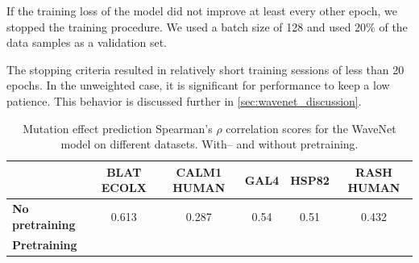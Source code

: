  If the training loss of the model did not improve at least every other epoch, we stopped the training procedure. We used a batch size of 128 and used $20\%$ of the data samples as a validation set.

The stopping criteria resulted in relatively short training sessions of less than 20 epochs. In the unweighted case, it is significant for performance to keep a low patience. This behavior is discussed further in \ref{sec:wavenet_discussion}. %




\begin{table}[ht]
    \centering
    \begin{tabularx}{\textwidth}{l ccccc}
    \hline
    & \textbf{BLAT ECOLX} & \textbf{CALM1 HUMAN} & \textbf{GAL4} & \textbf{HSP82} & \textbf{RASH HUMAN} \\ \hline
    \textbf{No pretraining} & 0.613 & 0.287 & 0.54 & 0.51 & 0.432 \\
    \textbf{Pretraining}    & & & & & \\
    \hline
    \end{tabularx}
    \caption{Mutation effect prediction Spearman's $\rho$ correlation scores for the WaveNet model on different datasets. With-- and without pretraining.}
    \label{tab:wavenet_rho_results}
\end{table}

